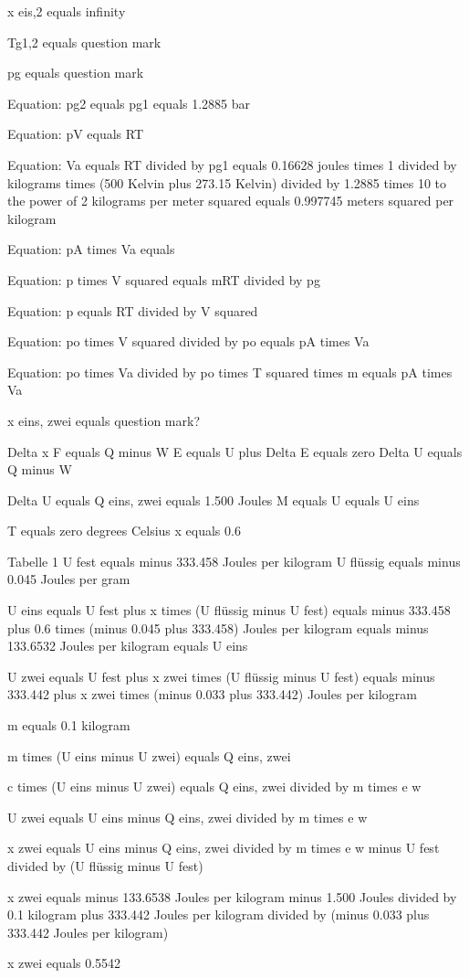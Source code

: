 x eis,2 equals infinity

Tg1,2 equals question mark

pg equals question mark

Equation: pg2 equals pg1 equals 1.2885 bar

Equation: pV equals RT

Equation: Va equals RT divided by pg1 equals 0.16628 joules times 1 divided by kilograms times (500 Kelvin plus 273.15 Kelvin) divided by 1.2885 times 10 to the power of 2 kilograms per meter squared equals 0.997745 meters squared per kilogram

Equation: pA times Va equals

Equation: p times V squared equals mRT divided by pg

Equation: p equals RT divided by V squared

Equation: po times V squared divided by po equals pA times Va

Equation: po times Va divided by po times T squared times m equals pA times Va

x eins, zwei equals question mark?

Delta x F equals Q minus W  
E equals U plus Delta E equals zero  
Delta U equals Q minus W

Delta U equals Q eins, zwei equals 1.500 Joules  
M equals U equals U eins

T equals zero degrees Celsius x equals 0.6

Tabelle 1  
U fest equals minus 333.458 Joules per kilogram  
U flüssig equals minus 0.045 Joules per gram

U eins equals U fest plus x times (U flüssig minus U fest)  
equals minus 333.458 plus 0.6 times (minus 0.045 plus 333.458) Joules per kilogram  
equals minus 133.6532 Joules per kilogram equals U eins

U zwei equals U fest plus x zwei times (U flüssig minus U fest)  
equals minus 333.442 plus x zwei times (minus 0.033 plus 333.442) Joules per kilogram

m equals 0.1 kilogram

m times (U eins minus U zwei) equals Q eins, zwei

c times (U eins minus U zwei) equals Q eins, zwei divided by m times e w

U zwei equals U eins minus Q eins, zwei divided by m times e w

x zwei equals U eins minus Q eins, zwei divided by m times e w minus U fest divided by (U flüssig minus U fest)

x zwei equals minus 133.6538 Joules per kilogram minus 1.500 Joules divided by 0.1 kilogram plus 333.442 Joules per kilogram divided by (minus 0.033 plus 333.442 Joules per kilogram)

x zwei equals 0.5542